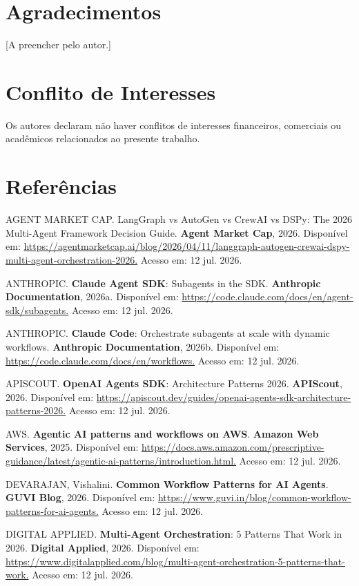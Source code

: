 \documentclass[12pt,a4paper]{article}
\begin{document}
\section*{Agradecimentos}

[A preencher pelo autor.]


\section*{Conflito de Interesses}

Os autores declaram não haver conflitos de interesses financeiros, comerciais ou acadêmicos relacionados ao presente trabalho.


\section*{Referências}

AGENT MARKET CAP. LangGraph vs AutoGen vs CrewAI vs DSPy: The 2026 Multi-Agent Framework Decision Guide. \textbf{Agent Market Cap}, 2026. Disponível em: \url{https://agentmarketcap.ai/blog/2026/04/11/langgraph-autogen-crewai-dspy-multi-agent-orchestration-2026.} Acesso em: 12 jul. 2026.

ANTHROPIC. \textbf{Claude Agent SDK}: Subagents in the SDK. \textbf{Anthropic Documentation}, 2026a. Disponível em: \url{https://code.claude.com/docs/en/agent-sdk/subagents.} Acesso em: 12 jul. 2026.

ANTHROPIC. \textbf{Claude Code}: Orchestrate subagents at scale with dynamic workflows. \textbf{Anthropic Documentation}, 2026b. Disponível em: \url{https://code.claude.com/docs/en/workflows.} Acesso em: 12 jul. 2026.

APISCOUT. \textbf{OpenAI Agents SDK}: Architecture Patterns 2026. \textbf{APIScout}, 2026. Disponível em: \url{https://apiscout.dev/guides/openai-agents-sdk-architecture-patterns-2026.} Acesso em: 12 jul. 2026.

AWS. \textbf{Agentic AI patterns and workflows on AWS}. \textbf{Amazon Web Services}, 2025. Disponível em: \url{https://docs.aws.amazon.com/prescriptive-guidance/latest/agentic-ai-patterns/introduction.html.} Acesso em: 12 jul. 2026.

DEVARAJAN, Vishalini. \textbf{Common Workflow Patterns for AI Agents}. \textbf{GUVI Blog}, 2026. Disponível em: \url{https://www.guvi.in/blog/common-workflow-patterns-for-ai-agents.} Acesso em: 12 jul. 2026.

DIGITAL APPLIED. \textbf{Multi-Agent Orchestration}: 5 Patterns That Work in 2026. \textbf{Digital Applied}, 2026. Disponível em: \url{https://www.digitalapplied.com/blog/multi-agent-orchestration-5-patterns-that-work.} Acesso em: 12 jul. 2026.
\end{document}
